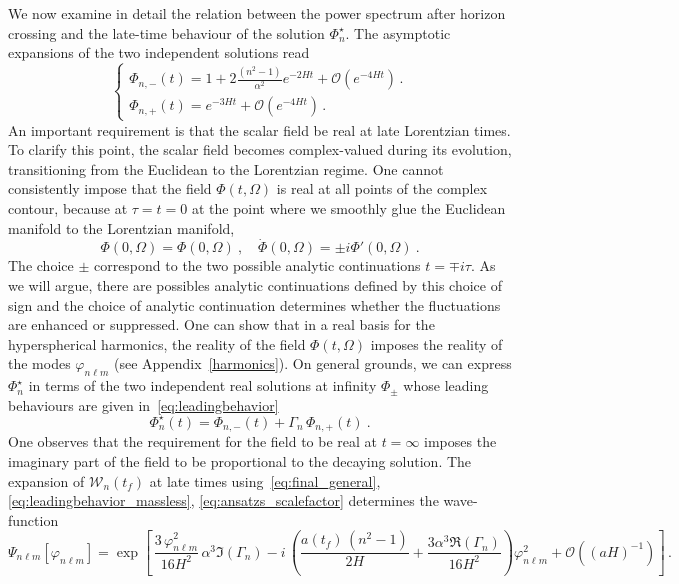 \documentclass[a4paper,11pt]{article}
\begin{document}
We now examine in detail the relation between the power spectrum  after horizon crossing and the late-time behaviour of the solution $\Phi_n^{\star}$. The asymptotic expansions of the two independent solutions read
\begin{equation}
    \begin{cases}
   \displaystyle  \Phi_{n,-}(t) = 1+ 2\frac{(n^2-1)}{\alpha^2  }e^{-2Ht} + \mathcal{O}(e^{-4Ht})\,.
\\[0.3cm]
   \displaystyle  \Phi_{n,+}(t) = e^{-3Ht} + \mathcal{O}(e^{-4Ht})\,.
\end{cases}
\label{eq:leadingbehavior_massless}
\end{equation}
An important requirement is that the scalar field be real at late Lorentzian times. To clarify this point, the scalar field becomes complex-valued during its evolution, transitioning from the Euclidean to the Lorentzian regime. One cannot consistently impose that the field $\Phi(t,\Omega)$ is real at all points of the complex contour, because at $\tau=t=0$ at the point where we smoothly glue the Euclidean manifold to the Lorentzian manifold, 
\begin{equation}\label{eq:gluing_condition}
\Phi(0,\Omega)=\Phi(0,\Omega)~, \quad \dot{\Phi}(0,\Omega)=\pm i\Phi'(0,\Omega)~. 
\end{equation}
The choice $\pm$ correspond to the two possible analytic continuations $t = \mp i\tau$. As we will argue, there are possibles analytic continuations defined by this choice of sign and the choice of analytic continuation determines whether the fluctuations are enhanced or suppressed.
One can show that in a real basis for the hyperspherical harmonics, the reality of the field $\Phi(t,\Omega)$ imposes the reality of the modes $\varphi_{n \ell m}$ (see Appendix~\ref{harmonics}). On general grounds, we can express $\Phi_{n}^\star$ in terms of the two independent real solutions at infinity $\Phi_\pm$ whose leading behaviours are given in~\eqref{eq:leadingbehavior} 
\begin{equation}\label{eq:phistar}
    \Phi_{n}^\star(t)=\Phi_{n,-}(t)+\Gamma_n\,\Phi_{n,+}(t)~.
\end{equation}
One observes that the requirement for the field to be real at $t=\infty$ imposes the imaginary part of the field to be proportional to the decaying solution. The expansion of $\mathcal{W}_n(t_f)$ at late times using~\eqref{eq:final_general}, \eqref{eq:leadingbehavior_massless}, \eqref{eq:ansatzs_scalefactor} determines the wave-function
\begin{equation}
    \Psi_{n \ell m}[\varphi_{n \ell m}]=\exp\left[\,\frac{3\,\varphi_{n \ell m}^2}{16H^2}\,\alpha^3\Im(\Gamma_n)-i\,\left(\frac{a(t_f)\,(n^2-1)}{2H}+\frac{3 \alpha^3 \Re(\Gamma_n)}{16H^2}\right)\varphi_{n \ell m}^2 + \mathcal{O}((aH)^{-1})\right]\,.
\end{equation}
\end{document}
